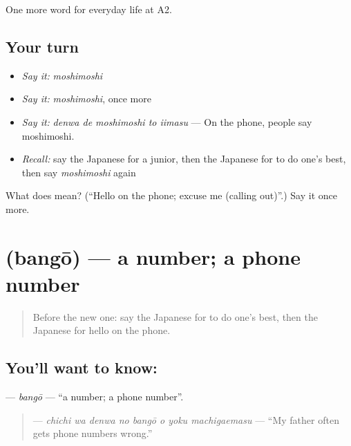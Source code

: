 \begin{grammarlens}[title={What you've built}]
One more word for everyday life at A2.
\end{grammarlens}

\subsection*{Your turn}
\begin{itemize}
\raggedright
  \item \emph{Say it:} \emph{moshimoshi}
  \item \emph{Say it:} \emph{moshimoshi}, once more
  \item \emph{Say it:} \emph{denwa de moshimoshi to iimasu} — On the phone, people say moshimoshi.
  \item \emph{Recall:} say the Japanese for a junior, then the Japanese for to do one's best, then say \emph{moshimoshi} again
\end{itemize}

\begin{tcolorbox}[breakable,colback=teal!4,colframe=teal!35!black,title={Before you move on}]
What does  mean? (\textquotedblleft{}Hello on the phone; excuse me (calling out)\textquotedblright{}.) Say it once more.
\end{tcolorbox}
\section[\texorpdfstring{\ja{ばんごう} (bangō)}{ばんごう (bangō)}]{ (bangō) — a number; a phone number}

\label{lesson:JA-C231-bangou}



\begin{quote}
Before the new one: say the Japanese for to do one's best, then the Japanese for hello on the phone.
\end{quote}

\subsection*{You'll want to know: }
\textbf{} — \emph{bangō} — \textquotedblleft{}a number; a phone number\textquotedblright{}.

\begin{quote}
\textbf{    } — \emph{chichi wa denwa no bangō o yoku machigaemasu} — \textquotedblleft{}My father often gets phone numbers wrong.\textquotedblright{}
\end{quote}

